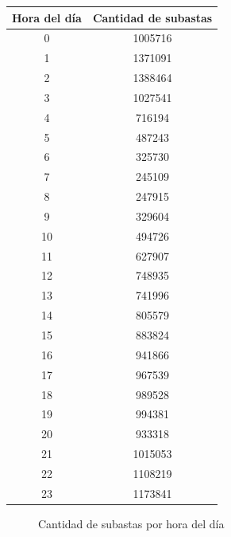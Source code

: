 \documentclass{article}
\begin{document}
	\FloatBarrier
	\begin{center}
		\begin{tabular}{ |c|c| }
	    	\hline
        	Hora del día & Cantidad de subastas \\
    	    \hline\hline
    	    0 & 1005716 \\
			\hline
			1 & 1371091 \\
			\hline
			2 & 1388464 \\
			\hline
			3 & 1027541 \\
			\hline
			4 & 716194 \\
			\hline
			5 & 487243 \\
			\hline
			6 & 325730 \\
			\hline
			7 & 245109 \\
			\hline
			8 & 247915 \\
			\hline
			9 & 329604 \\
			\hline
			10 & 494726 \\
			\hline
			11 & 627907 \\
			\hline
			12 & 748935 \\
			\hline
			13 & 741996 \\
			\hline
			14 & 805579 \\
			\hline
			15 & 883824 \\
			\hline
			16 & 941866 \\
			\hline
			17 & 967539 \\
			\hline
			18 & 989528 \\
			\hline
			19 & 994381 \\
			\hline
			20 & 933318 \\
			\hline
			21 & 1015053 \\
			\hline
			22 & 1108219 \\
			\hline
			23 & 1173841 \\
			\hline
		\end{tabular}
	\end{center}
   
		\begin{figure}
			\centering
		   	\caption{Cantidad de subastas por hora del día}
			\label{subastashora}
		\end{figure}
	\FloatBarrier
\end{document}
